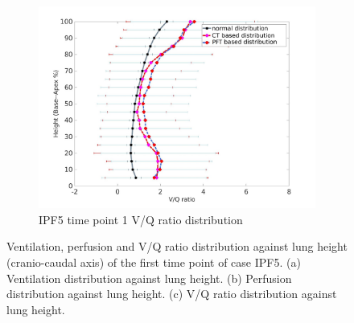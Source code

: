 \begin{figure}[htbp]
\begin{subfigure}{.6\linewidth}
  \includegraphics[width=\linewidth,trim={{.0\wd0} {.0\wd0} {.0\wd0} {.0\wd0}},clip]{Appendix/Image_AppexB/IPF511/IPF511_VQAgainstLungHeight.jpg}
  \caption{IPF5 time point 1 V/Q ratio distribution}
  \label{fig:VQDistribution-c}
\end{subfigure}
\caption{ Ventilation, perfusion and V/Q ratio distribution against lung height (cranio-caudal axis) of the first time point of case IPF5. (a) Ventilation distribution against lung height. (b) Perfusion distribution against lung height. (c) V/Q ratio distribution against lung height.}
\label{fig:VQDistribution}
\end{figure}


